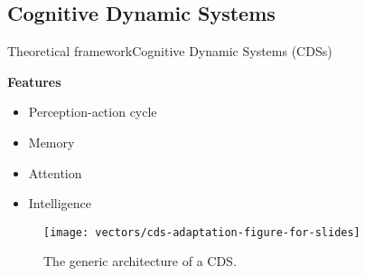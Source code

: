 \subsection{Cognitive Dynamic Systems}
\begin{frame}{Theoretical framework}{Cognitive Dynamic Systems (CDSs)}
\small
\vspace{-0.2cm}


\begin{block}{\small \textbf{Features}}
\begin{itemize}
  \item Perception-action cycle

  \item Memory

  \item Attention

  \item Intelligence
\end{itemize}


\end{block}

\begin{figure}
    \texttt{[image: vectors/cds-adaptation-figure-for-slides]}
    \caption{The generic architecture of a CDS.}
\end{figure}


\end{frame}
